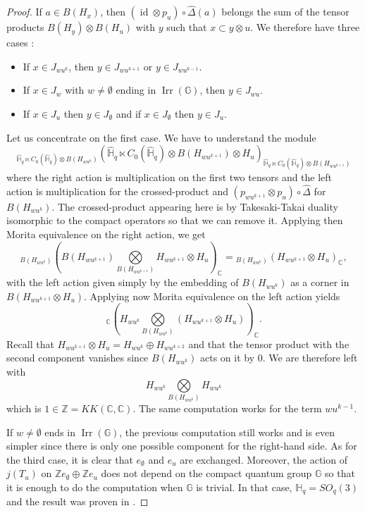 \documentclass[a4paper, 11pt]{amsart}
\theoremstyle{plain}
\theoremstyle{definition}
\theoremstyle{remark}
\DeclareMathOperator{\id}{id}
\DeclareMathOperator{\Irr}{Irr}
\newcommand{\C}{\mathbb{C}}
\newcommand{\D}{\Delta}
\newcommand{\G}{\mathbb{G}}
\newcommand{\HH}{\mathbb{H}}
\newcommand{\Z}{\mathbb{Z}}
\begin{document}
\begin{proof}
If $a\in B(H_{x})$, then $(\id\otimes p_{u})\circ\widehat{\D}(a)$ belongs the sum of the tensor products $B(H_{y})\otimes B(H_{u})$ with $y$ such that $x\subset y\otimes u$. We therefore have three cases :
\begin{itemize}
\item If $x\in J_{wu^{k}}$, then $y \in J_{wu^{k+1}}$ or $y\in J_{wu^{k-1}}$.
\item If $x\in J_{w}$ with $w\neq\emptyset$ ending in $\Irr(\G)$, then $y\in J_{wu}$.
\item If $x\in J_{u}$ then $y\in J_{\emptyset}$ and if $x\in J_{\emptyset}$ then $y\in J_{u}$.
\end{itemize}
Let us concentrate on the first case. We have to understand the module
\begin{equation*}
{}_{\widehat{\HH}_{q}\ltimes C_{0}(\widehat{\HH}_{q})\otimes B(H_{wu^{k}})}\left(\widehat{\HH}_{q}\ltimes C_{0}(\widehat{\HH}_{q})\otimes B(H_{wu^{k+1}})\otimes H_{u}\right)_{\widehat{\HH}_{q}\ltimes C_{0}(\widehat{\HH}_{q})\otimes B(H_{wu^{k+1}})}
\end{equation*}
where the right action is multiplication on the first two tensors and the left action is multiplication for the crossed-product and $(p_{wu^{k+1}}\otimes p_{u})\circ\widehat{\D}$ for $B(H_{wu^{k}})$. The crossed-product appearing here is by Takesaki-Takai duality isomorphic to the compact operators so that we can remove it. Applying then Morita equivalence on the right action, we get
\begin{equation*}
{}_{B(H_{wu^{k}})}(B(H_{wu^{k+1}})\underset{B(H_{wu^{k+1}})}{\bigotimes}H_{wu^{k+1}}\otimes H_{u})_{\C} = {}_{B(H_{wu^{k}})}(H_{wu^{k+1}}\otimes H_{u})_{\C},
\end{equation*}
with the left action given simply by the embedding of $B(H_{wu^{k}})$ as a corner in $B(H_{wu^{k+1}}\otimes H_{u})$. Applying now Morita equivalence on the left action yields
\begin{equation*}
{}_{\C}(H_{wu^{k}}\underset{B(H_{wu^{k}})}{\bigotimes}(H_{wu^{k+1}}\otimes H_{u}))_{\C}.
\end{equation*}
Recall that $H_{wu^{k+1}}\otimes H_{u} = H_{wu^{k}}\oplus H_{wu^{k+2}}$ and that the tensor product with the second component vanishes since $B(H_{wu^{k}})$ acts on it by $0$. We are therefore left with
\begin{equation*}
H_{wu^{k}}\underset{B(H_{wu^{k}})}{\bigotimes}H_{wu^{k}}
\end{equation*}
which is $1\in \Z = KK(\C, \C)$. The same computation works for the term $wu^{k-1}$.

If $w\neq\emptyset$ ends in $\Irr(\G)$, the previous computation still works and is even simpler since there is only one possible component for the right-hand side. As for the third case, it is clear that $e_{\emptyset}$ and $e_{u}$ are exchanged. Moreover, the action of $j(T_{u})$ on $\Z e_{\emptyset}\oplus\Z e_{u}$ does not depend on the compact quantum group $\G$ so that it is enough to do the computation when $\G$ is trivial. In that case, $\HH_{q} = SO_{q}(3)$ and the result was proven in \cite[Sec 5]{voigt2012quantum}.
\end{proof}
\end{document}
